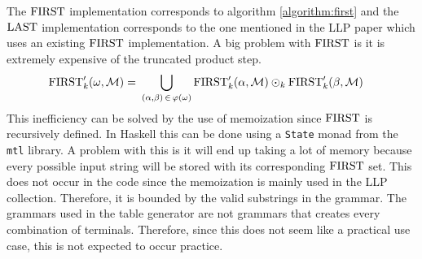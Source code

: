 The $\text{FIRST}$ implementation corresponds to algorithm \ref{algorithm:first} and the $\text{LAST}$ implementation corresponds to the one mentioned in the LLP paper \cite[12]{Vagner2007} which uses an existing $\text{FIRST}$ implementation. A big problem with $\text{FIRST}$ is it is extremely expensive of the truncated product step.
\begin{align*}
    \text{FIRST}'_k(\omega, \mathcal{M}) =&\,\, \bigcup_{(\alpha, \beta) \, \in \, \varphi(\omega)} \text{FIRST}'_k(\alpha, \mathcal{M}) \odot_k \text{FIRST}'_k(\beta, \mathcal{M})
\end{align*}
This inefficiency can be solved by the use of memoization since $\text{FIRST}$ is recursively defined. In Haskell this can be done using a \lstinline{State} monad from the \lstinline{mtl} library. A problem with this is it will end up taking a lot of memory because every possible input string will be stored with its corresponding $\text{FIRST}$ set. This does not occur in the code since the memoization is mainly used in the LLP collection. Therefore, it is bounded by the valid substrings in the grammar. The grammars used in the table generator are not grammars that creates every combination of terminals. Therefore, since this does not seem like a practical use case, this is not expected to occur practice.